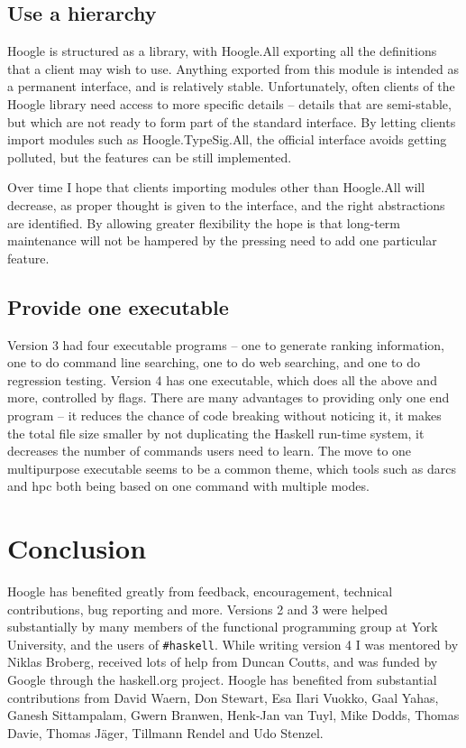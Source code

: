 \documentclass{tmr}
\newcommand{\code}[1]{\textsf{#1}}
\begin{document}
\subsection{Use a hierarchy}

Hoogle is structured as a library, with \code{Hoogle.All} exporting all the definitions that a client may wish to use. Anything exported from this module is intended as a permanent interface, and is relatively stable. Unfortunately, often clients of the Hoogle library need access to more specific details -- details that are semi-stable, but which are not ready to form part of the standard interface. By letting clients import modules such as \code{Hoogle.TypeSig.All}, the official interface avoids getting polluted, but the features can be still implemented.

Over time I hope that clients importing modules other than \code{Hoogle.All} will decrease, as proper thought is given to the interface, and the right abstractions are identified. By allowing greater flexibility the hope is that long-term maintenance will not be hampered by the pressing need to add one particular feature.

\subsection{Provide one executable}

Version 3 had four executable programs -- one to generate ranking information, one to do command line searching, one to do web searching, and one to do regression testing. Version 4 has one executable, which does all the above and more, controlled by flags. There are many advantages to providing only one end program -- it reduces the chance of code breaking without noticing it, it makes the total file size smaller by not duplicating the Haskell run-time system, it decreases the number of commands users need to learn. The move to one multipurpose executable seems to be a common theme, which tools such as darcs and hpc both being based on one command with multiple modes.

\section{Conclusion}

Hoogle has benefited greatly from feedback, encouragement, technical contributions, bug reporting and more. Versions 2 and 3 were helped substantially by many members of the functional programming group at York University, and the users of \verb"#haskell". While writing version 4 I was mentored by Niklas Broberg, received lots of help from Duncan Coutts, and was funded by Google through the haskell.org project. Hoogle has benefited from substantial contributions from David Waern, Don Stewart, Esa Ilari Vuokko, Gaal Yahas, Ganesh Sittampalam, Gwern Branwen, Henk-Jan van Tuyl, Mike Dodds, Thomas Davie, Thomas J\"{a}ger, Tillmann Rendel and Udo Stenzel.
\end{document}
